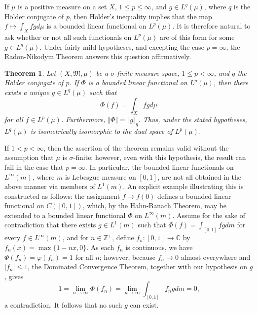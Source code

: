 \documentclass[12pt]{article}
\theoremstyle{plain}
\newtheorem*{thm*}{Theorem}
\newcommand{\set}[1]{\{#1\}}
\newcommand{\abs}[1]{\vert#1\vert}
\newcommand{\norm}[1]{\Vert#1\Vert}
\begin{document}
If $\mu$ is a positive measure on a set $X$, $1\leq p\leq\infty$, and $g\in L^q(\mu)$, where $q$ is the H\"{o}lder conjugate of $p$, then H\"{o}lder's inequality implies that the map $f\mapsto\int_Xfgd\mu$ is a bounded linear functional on $L^p(\mu)$. It is therefore natural to ask whether or not all such functionals on $L^p(\mu)$ are of this form for some $g\in L^q(\mu)$. Under fairly mild hypotheses, and excepting the case $p=\infty$, the Radon-Nikodym Theorem answers this question affirmatively.
\begin{thm*}
Let $(X,\mathfrak{M},\mu)$ be a $\sigma$-finite measure space, $1\leq p<\infty$, and $q$ the H\"{o}lder conjugate of $p$. If $\Phi$ is a bounded linear functional on $L^p(\mu)$, then there exists a unique $g\in L^q(\mu)$ such that
\begin{equation}
\Phi(f)=\int_Xfgd\mu
\end{equation}
for all $f\in L^p(\mu)$. Furthermore, $\norm{\Phi}=\norm{g}_q$. Thus, under the stated hypotheses, $L^q(\mu)$ is isometrically isomorphic to the dual space of $L^p(\mu)$.
\end{thm*}
If $1<p<\infty$, then the assertion of the theorem remains valid without the assumption that $\mu$ is $\sigma$-finite; however, even with this hypothesis, the result can fail in the case that $p=\infty$. In particular, the bounded linear functionals on $L^\infty(m)$, where $m$ is Lebesgue measure on $[0,1]$, are not all obtained in the above manner via members of $L^1(m)$. An explicit example illustrating this is constructed as follows: the assignment $f\mapsto f(0)$ defines a bounded linear functional on $C([0,1])$, which, by the Hahn-Banach Theorem, may be extended to a bounded linear functional $\Phi$ on $L^\infty(m)$. Assume for the sake of contradiction that there exists $g\in L^1(m)$ such that $\Phi(f)=\int_{[0,1]}fgdm$ for every $f\in L^\infty(m)$, and for $n\in\mathbb{Z}^+$, define $f_n:[0,1]\rightarrow\mathbb{C}$ by $f_n(x)=\max\set{1-nx,0}$. As each $f_n$ is continuous, we have $\Phi(f_n)=\varphi(f_n)=1$ for all $n$; however, because $f_n\rightarrow 0$ almost everywhere and $\abs{f_n}\leq 1$, the Dominated Convergence Theorem, together with our hypothesis on $g$, gives
\begin{equation*}
1=\lim_{n\rightarrow\infty}\Phi(f_n)=\lim_{n\rightarrow\infty}\int_{[0,1]}f_ngdm=0\text{,}
\end{equation*}
a contradiction. It follows that no such $g$ can exist.

\end{document}
